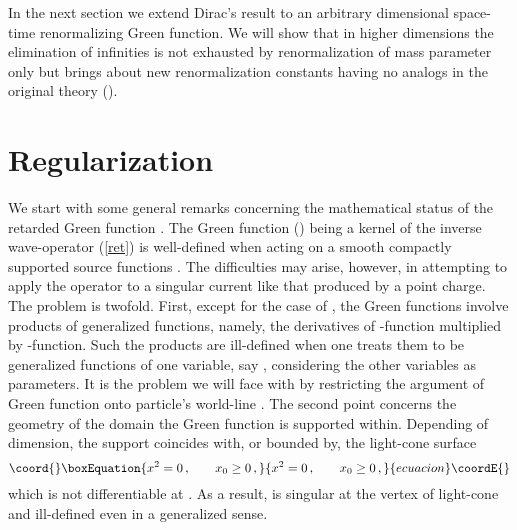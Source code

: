 \documentclass[a4paper,12pt]{article}
\begin{document}
In the next section we extend Dirac's result to an arbitrary dimensional
space-time renormalizing Green function. We will show that in higher
dimensions the elimination of infinities is not exhausted by renormalization
of mass parameter \coordHE{} only but brings about new renormalization constants
having no analogs in the original theory (\myHighlight{$\ref{act}$}\coordHE{}).

\section{ Regularization}

We start with some general remarks concerning the mathematical status of the
retarded Green function \coordHE{}. The Green function (\myHighlight{$\ref{gf}$}\coordHE{}) being a kernel
of the inverse wave-operator (\ref{ret}) is well-defined when acting on a
smooth compactly supported source functions \coordHE{}. The difficulties may
arise, however, in attempting to apply the operator to a singular current
like that produced by a point charge. The problem is twofold. First, except
for the case of \coordHE{}, the Green functions involve products of generalized
functions, namely, the derivatives of \myHighlight{$\delta$}\coordHE{}-function multiplied by \myHighlight{$%
\theta $}\coordHE{}-function. Such the products are ill-defined when one treats them to
be generalized functions of one variable, say \coordHE{}, considering the other
variables as parameters. It is the problem we will face with by restricting
the argument of Green function onto particle's world-line \coordHE{}.
The second point concerns the geometry of the domain the Green function is
supported within. Depending of dimension, the support coincides with, or
bounded by, the light-cone surface
\begin{equation}\coord{}\boxEquation{  \label{lc}
x^2=0\,,\;\;\;\;\;\;\;x_0\geq 0\,,
}{  x^2=0\,,\;\;\;\;\;\;\;x_0\geq 0\,,
}{ecuacion}\coordE{}\end{equation}
which is not differentiable at \coordHE{}. As a result, \coordHE{} is singular
at the vertex of light-cone and ill-defined even in a generalized sense.
\end{document}
